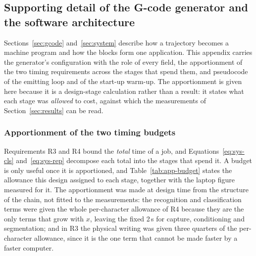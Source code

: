 
\subsection{Supporting detail of the G-code generator and the software architecture}
\label{sec:app-sys}

Sections~\ref{sec:gcode} and~\ref{sec:system} describe how a trajectory becomes a machine program and how the blocks form one application.
This appendix carries the generator's configuration with the role of every field, the apportionment of the two timing requirements across the stages that spend them, and pseudocode of the emitting loop and of the start-up warm-up.
The apportionment is given here because it is a design-stage calculation rather than a result: it states what each stage was \emph{allowed} to cost, against which the measurements of Section~\ref{sec:results} can be read.


\subsubsection{Apportionment of the two timing budgets}

Requirements R3 and R4 bound the \emph{total} time of a job, and Equations~\ref{eq:sys-cls} and~\ref{eq:sys-rep} decompose each total into the stages that spend it.
A budget is only useful once it is apportioned, and Table~\ref{tab:app-budget} states the allowance this design assigned to each stage, together with the laptop figure measured for it.
The apportionment was made at design time from the structure of the chain, not fitted to the measurements: the recognition and classification terms were given the whole per-character allowance of R4 because they are the only terms that grow with $x$, leaving the fixed 2\,s for capture, conditioning and segmentation; and in R3 the physical writing was given three quarters of the per-character allowance, since it is the one term that cannot be made faster by a faster computer.

